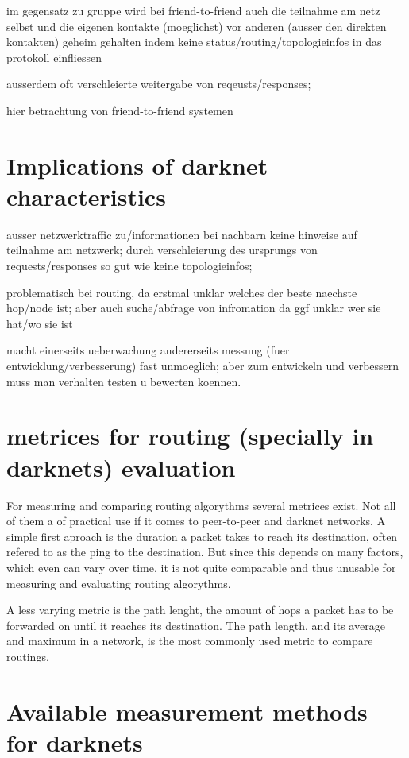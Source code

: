 im gegensatz zu gruppe wird bei friend-to-friend auch die teilnahme am netz selbst und die eigenen kontakte (moeglichst) vor anderen (ausser den direkten kontakten) geheim gehalten indem keine status/routing/topologieinfos in das protokoll einfliessen

ausserdem oft verschleierte weitergabe von reqeusts/responses;

hier betrachtung von friend-to-friend systemen

\section{Implications of darknet characteristics}

ausser netzwerktraffic zu/informationen bei nachbarn keine hinweise auf teilnahme am netzwerk; durch verschleierung des ursprungs von requests/responses so gut wie keine topologieinfos;

problematisch bei routing, da erstmal unklar welches der beste naechste hop/node ist; aber auch suche/abfrage von infromation da ggf unklar wer sie hat/wo sie ist

macht einerseits ueberwachung andererseits messung (fuer entwicklung/verbesserung) fast unmoeglich; aber zum entwickeln und verbessern muss man verhalten testen u bewerten koennen.

\section{metrices for routing (specially in darknets) evaluation}

For measuring and comparing routing algorythms several metrices exist. Not all of them a of practical use if it comes to peer-to-peer and darknet networks. A simple first aproach  is the duration a packet takes to reach its destination, often refered to as the ping to the destination. But since this depends on many factors, which even can vary over time, it is not quite comparable and thus unusable for measuring and evaluating routing algorythms.

A less varying metric is the path lenght, the amount of hops a packet has to be forwarded on until it reaches its destination. The path length, and its average and maximum in a network, is the most commonly used metric to compare routings.



\section{Available measurement methods for darknets}

